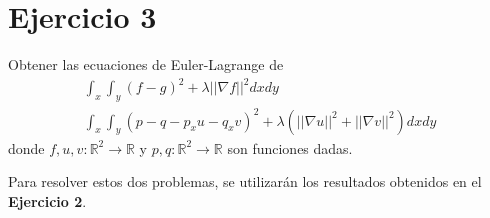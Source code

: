 \documentclass[11pt,letterpaper]{article}
\theoremstyle{definition}
\theoremstyle{definition}
\theoremstyle{definition}
\begin{document}
\section*{Ejercicio 3}
\begin{shaded}
	Obtener las ecuaciones de Euler-Lagrange de
\small{	\begin{eqnarray}
		\int_x \int_y (f-g)^2 + \lambda || \nabla f ||^2 dx dy \\
		\int_x \int_y (p - q -p_x u - q_x v)^2 + \lambda (|| \nabla u ||^2 + || \nabla v ||^2) dx dy	
	\end{eqnarray}}
donde $ f, u, v : \mathbb{R}^2 \to \mathbb{R} $ y $ p, q : \mathbb{R}^2 \to \mathbb{R} $ son funciones dadas.
\end{shaded}
Para resolver estos dos problemas, se utilizarán los resultados obtenidos en el \textbf{Ejercicio 2}.
\end{document}
